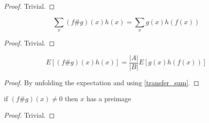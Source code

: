 \begin{proof}
    \leanok
    Trivial.
\end{proof}

\begin{lemma}
    \label{transfer_sum}
    \leanok
    $$\sum_x {(f \# g) (x) h(x)} = \sum_x {g(x) h(f(x))}$$
\end{lemma}

\begin{proof}
    \leanok
    Trivial.
\end{proof}

\begin{lemma}
    \label{transfer_expect}
    \leanok
    $$E[(f \# g) (x) h(x)] = \frac{|A|}{|B|} E[g(x) h(f(x))]$$
\end{lemma}

\begin{proof}
    \leanok
    By unfolding the expectation and using \ref{transfer_sum}.
\end{proof}



\begin{lemma}
    \label{transfer_ne_zero}
    \leanok
    if $(f \# g) (x) \neq 0$ then $x$ has a preimage
\end{lemma}

\begin{proof}
    \leanok
    Trivial.
\end{proof}